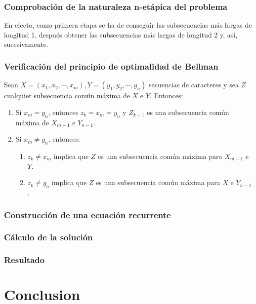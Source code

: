 \documentclass[13pt]{beamer}
\begin{document}
    \begin{frame}
		\frametitle{Comprobación de la naturaleza n-etápica del problema}
        En efecto, como primera etapa se ha de conseguir las subsecuencias más largas de longitud 1, 
        después obtener las subsecuencias más largas de longitud 2 y, así, sucesivamente. 
	\end{frame}

    \begin{frame}
		\frametitle{Verificación del principio de optimalidad de Bellman}
        \begin{theorem}
            Sean $X=(x_1,x_2,\cdots, x_m),Y=(y_1,y_2, \cdots, y_n)$ secuencias de caracteres 
            y sea $Z$ cualquier subsecuencia común máxima 
            de $X$ e $Y$. Entonces:
            \begin{enumerate}
              \item Si $x_m = y_n$, entonces $z_k = x_m = y_n$ y $Z_{k-1}$ es una subsecuencia
              común máxima de $X_{m-1}$ e $Y_{n-1}$. 
              \item Si $x_m \neq y_n$, entonces:
              \begin{enumerate}
                \item $z_k \neq x_m$ implica que $Z$ es una subsecuencia común máxima para $X_{m-1}$ e $Y$. 
                \item $z_k \neq y_n$ implica que $Z$ es una subsecuencia común máxima para $X$ e $Y_{n-1}$. 
              \end{enumerate}
            \end{enumerate}
        \end{theorem}
	\end{frame}

    \begin{frame}
		\frametitle{Construcción de una ecuación recurrente}
        
	\end{frame}

    \begin{frame}
		\frametitle{Cálculo de la solución}
        
	\end{frame}


    \begin{frame}
		\frametitle{Resultado}
        
	\end{frame}

	\section{Conclusion}
\end{document}
